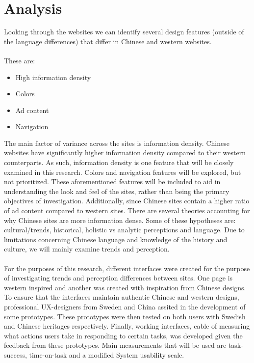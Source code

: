  
 \section{Analysis}
Looking through the websites we can identify several design features (outside of the language differences) that differ in Chinese and western websites. 
\\\\
These are:
 \begin{itemize}
 \item High information density
 \item Colors
 \item Ad content
 \item Navigation
 \end{itemize}
 
 The main factor of variance across the sites is information density. Chinese websites have significantly higher information density compared to their western counterparts. As such, information density is one feature that will be closely examined in this research. Colors and navigation features will be explored, but not prioritized. These aforementioned features will be included to aid in understanding the look and feel of the sites, rather than being the primary objectives of investigation. Additionally, since Chinese sites contain a higher ratio of ad content compared to western sites. There are several theories accounting for why Chinese sites are more information dense. Some of these hypotheses are: cultural/trends, historical, holistic vs analytic perceptions and language. Due to limitations concerning Chinese language and knowledge of the history and culture, we will mainly examine trends and perception.
 \\\\
For the purposes of this research, different interfaces were created for the purpose of investigating trends and perception differences between sites. One page is western inspired and another was created with inspiration from Chinese designs. To ensure that the interfaces maintain authentic Chinese and western designs, professional UX-designers from Sweden and China assited in the development of some prototypes. These prototypes were then tested on both users with Swedish and Chinese heritages respectively. Finally, working interfaces, cable of measuring what actions users take in responding to certain tasks, was developed given the feedback from these prototypes. Main measurements that will be used are task-success, time-on-task and a modified System usability scale. \cite{brooke1996sus} 
